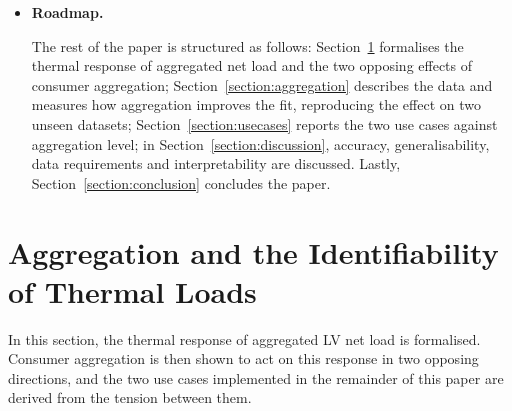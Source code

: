 \documentclass[9pt,journal,a4]{IEEEtran}
\begin{document}
\begin{itemize}
This paper makes three contributions:

\begin{enumerate}

\item It formalises consumer aggregation as the governing variable in the identifiability of Electric Thermostatic Loads from aggregated LV net load, separating the predictability that aggregation confers from the attributability it removes.

\item It implements two use cases derived from a single fit, namely Detection and Energy Estimation, and reports each as a function of the aggregation level. Each is scored against submetered ground truth, yet requires only net load and ambient temperature to be applied.

\item It reproduces the aggregation effect on two further previously unseen datasets, drawn from different climates and building stocks, one of them driven by cooling rather than heating, using nested sequences of aggregates and without recalibrating the fitting procedure.

\end{enumerate}

\item \textbf{Roadmap.}

The rest of the paper is structured as follows: Section~\ref{section:identify} formalises the thermal response of aggregated net load and the two opposing effects of consumer aggregation; Section~\ref{section:aggregation} describes the data and measures how aggregation improves the fit, reproducing the effect on two unseen datasets; Section~\ref{section:usecases} reports the two use cases against aggregation level; in Section~\ref{section:discussion}, accuracy, generalisability, data requirements and interpretability are discussed. Lastly, Section~\ref{section:conclusion} concludes the paper.

\end{itemize}

\section{Aggregation and the Identifiability of Thermal Loads}
\label{section:identify}

In this section, the thermal response of aggregated LV net load is formalised. Consumer aggregation is then shown to act on this response in two opposing directions, and the two use cases implemented in the remainder of this paper are derived from the tension between them.
\end{document}
